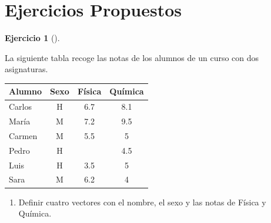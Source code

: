 \documentclass[
  a4paper,
]{scrreport}
\providecommand{\tightlist}{%
  \setlength{\itemsep}{0pt}\setlength{\parskip}{0pt}}\usepackage{longtable,booktabs,array}
\theoremstyle{definition}
\newtheorem{exercise}{Ejercicio}[chapter]
\theoremstyle{remark}
\begin{document}
\hypertarget{ejercicios-propuestos}{%
\section{Ejercicios Propuestos}\label{ejercicios-propuestos}}

\leavevmode{}%
\begin{exercise}[]\label{exr-preprocesaimento-5}

La siguiente tabla recoge las notas de los alumnos de un curso con dos
asignaturas.

\begin{longtable}[]{@{}lccc@{}}
\toprule()
Alumno & Sexo & Física & Química \\
\midrule()
\endhead
Carlos & H & 6.7 & 8.1 \\
María & M & 7.2 & 9.5 \\
Carmen & M & 5.5 & 5 \\
Pedro & H & & 4.5 \\
Luis & H & 3.5 & 5 \\
Sara & M & 6.2 & 4 \\
\bottomrule()
\end{longtable}

\begin{enumerate}
\def\labelenumi{\alph{enumi}.}
\tightlist
\item
  Definir cuatro vectores con el nombre, el sexo y las notas de Física y
  Química.
\end{enumerate}

\begin{tcolorbox}[enhanced jigsaw, breakable, arc=.35mm, leftrule=.75mm, toptitle=1mm, opacitybacktitle=0.6, opacityback=0, title=\textcolor{quarto-callout-tip-color}{\faLightbulb}\hspace{0.5em}{Solución}, colframe=quarto-callout-tip-color-frame, titlerule=0mm, bottomtitle=1mm, colback=white, bottomrule=.15mm, colbacktitle=quarto-callout-tip-color!10!white, toprule=.15mm, rightrule=.15mm, left=2mm, coltitle=black]


\end{tcolorbox}
\end{exercise}
\end{document}

